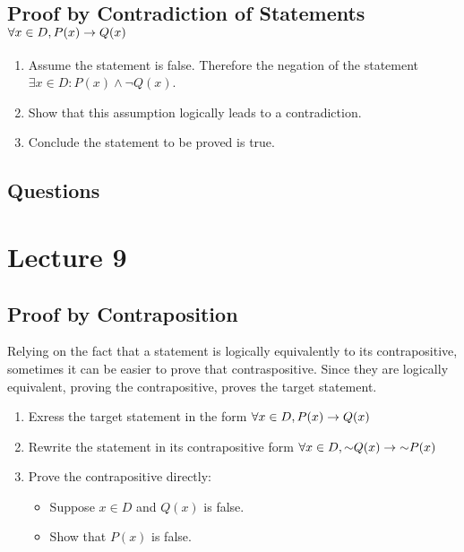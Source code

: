 \documentclass{report}
\begin{document}
\subsection*{Proof by Contradiction of Statements $\forall x\in D, P(x)\rightarrow Q(x)$}
\begin{enumerate}
	\item Assume the statement is false. Therefore the negation of the statement $\exists x\in D: P(x)\land \lnot Q(x)$.
	\item Show that this assumption logically leads to a contradiction.
	\item Conclude the statement to be proved is true.
\end{enumerate}

\subsection*{Questions}
\qs{}{}

\newpage
\section{Lecture 9}
\subsection*{Proof by Contraposition}
Relying on the fact that a statement is logically equivalently to its contrapositive, sometimes it can be easier to prove that contraspositive. Since they are logically equivalent, proving the contrapositive, proves the target statement.
\begin{enumerate}
	\item Exress the target statement in the form $\forall x\in D, P(x)\rightarrow Q(x)$
	\item Rewrite the statement in its contrapositive form $\forall x\in D, \mathord{\sim} Q(x)\rightarrow\mathord{\sim} P(x)$
	\item Prove the contrapositive directly:
	\begin{itemize}
		\item Suppose $x\in D$ and $Q(x)$ is false.
		\item Show that $P(x)$ is false.
	\end{itemize}
\end{enumerate}
\end{document}
